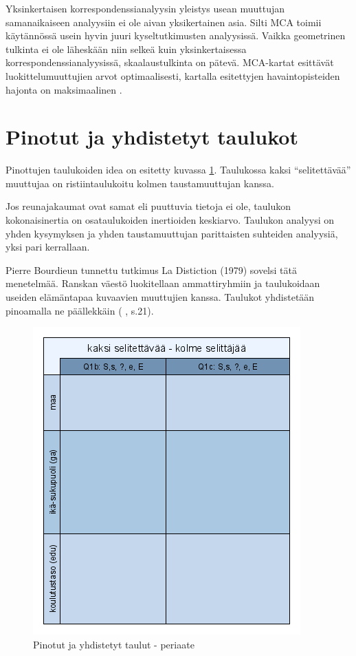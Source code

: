 \documentclass[
  finnish,
]{book}
\begin{document}
Yksinkertaisen korrespondenssianalyysin yleistys usean muuttujan samanaikaiseen
analyysiin ei ole aivan yksikertainen asia. Silti MCA toimii käytännössä usein
hyvin juuri kyseltutkimusten analyysissä. Vaikka geometrinen tulkinta ei ole
läheskään niin selkeä kuin yksinkertaisessa korrespondenssianalyysissä,
skaalaustulkinta on pätevä. MCA-kartat esittävät luokittelumuuttujien arvot
optimaalisesti, kartalla esitettyjen havaintopisteiden hajonta on maksimaalinen
\citep[ , s. 447, kts. myös Liite 1]{RefWorks:doc:5a857a44e4b0ed2d44664d84}.

\hypertarget{pinotut-ja-yhdistetyt-taulukot}{%
\section{Pinotut ja yhdistetyt taulukot}\label{pinotut-ja-yhdistetyt-taulukot}}

Pinottujen taulukoiden idea on esitetty kuvassa \ref{fig:stackedimg1}. Taulukossa
kaksi ``selitettävää'' muuttujaa on ristiintaulukoitu kolmen taustamuuttujan kanssa.

Jos reunajakaumat ovat samat eli puuttuvia tietoja ei ole, taulukon kokonaisinertia
on osataulukoiden inertioiden keskiarvo. Taulukon analyysi on yhden kysymyksen
ja yhden taustamuuttujan parittaisten suhteiden analyysiä, yksi pari kerrallaan.

Pierre Bourdieun tunnettu tutkimus La Distiction (1979) sovelsi tätä menetelmää.
Ranskan väestö luokitellaan ammattiryhmiin ja taulukoidaan useiden elämäntapaa
kuvaavien muuttujien kanssa. Taulukot yhdistetään pinoamalla ne
päällekkäin ( \citet{RefWorks:doc:5ab76b43e4b003f4468d1f07} , s.21).

\begin{figure}

{\centering \includegraphics[width=0.5\linewidth]{img/stacked1} 

}

\caption{Pinotut ja yhdistetyt taulut - periaate}\label{fig:stackedimg1}
\end{figure}
\end{document}
